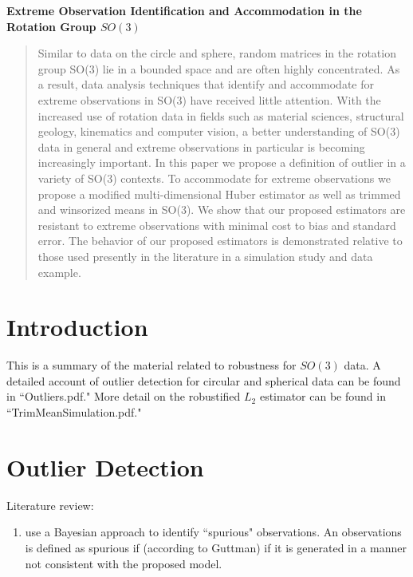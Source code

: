 \documentclass{article}\usepackage{graphicx, color}
\begin{document}
\begin{center}
\Large{\bf Extreme Observation Identification and Accommodation in the Rotation Group $SO(3)$}
\end{center}
\begin{abstract}
Similar to data on the circle and sphere, random matrices in the rotation group SO(3) lie in a bounded space and are often highly concentrated.  As a result, data analysis techniques that identify and accommodate for extreme observations in SO(3) have received little attention.  With the increased use of rotation data in fields such as material sciences, structural geology, kinematics and computer vision, a better understanding of SO(3) data in general and extreme observations in particular is becoming increasingly important.  In this paper we propose a definition of outlier in a variety of SO(3) contexts.  To accommodate for extreme observations we propose a modified multi-dimensional Huber estimator as well as trimmed and winsorized means in SO(3).  We show that our proposed estimators are resistant to extreme observations with minimal cost to bias and standard error.  The behavior of our proposed estimators is demonstrated relative to those used presently in the literature in a simulation study and data example.
\end{abstract}

\section{Introduction}\label{sec:intro}
This is a summary of the material related to robustness for $SO(3)$ data.  A detailed account of outlier detection for circular and spherical data can be found in ``Outliers.pdf."  More detail on the robustified $L_2$ estimator can be found in ``TrimMeanSimulation.pdf."



 
\section{Outlier Detection}\label{sec:outliers}
 
Literature review:
\begin{enumerate}
\item \cite{bagchi1990} use a Bayesian approach to identify ``spurious" observations.  An observations is defined as spurious if (according to Guttman) if it is generated in a manner not consistent with the proposed model.
\end{enumerate}
 
\end{document}
